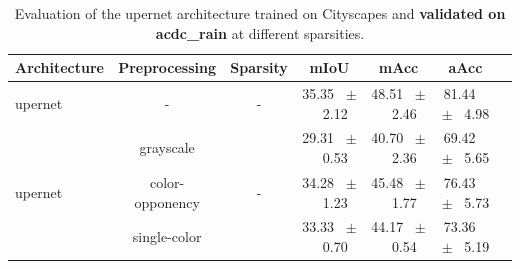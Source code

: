 \begin{table}[h]
  \centering
  \caption{Evaluation of the upernet architecture trained on Cityscapes and \textbf{validated on acdc_rain} at different sparsities.}
  \begin{tabular}{@{}lccc ccc@{}}
    \toprule
    Architecture & Preprocessing & Sparsity & mIoU & mAcc & aAcc \\
    \midrule
    upernet & - & - & 35.35 ~$\pm$~ 2.12 & 48.51 ~$\pm$~ 2.46 & 81.44 ~$\pm$~ 4.98 \\
    \midrule
    \midrule
    \multirow{3}{*}{upernet} & grayscale & \multirow{3}{*}{-} & 29.31 ~$\pm$~ 0.53 & 40.70 ~$\pm$~ 2.36 & 69.42 ~$\pm$~ 5.65 \\
    & color-opponency & & 34.28 ~$\pm$~ 1.23 & 45.48 ~$\pm$~ 1.77 & 76.43 ~$\pm$~ 5.73 \\
    & single-color & & 33.33 ~$\pm$~ 0.70 & 44.17 ~$\pm$~ 0.54 & 73.36 ~$\pm$~ 5.19 \\
    \midrule
    \bottomrule
  \end{tabular}
  \label{tab:sparse_upernet_acdc_rain}
\end{table}